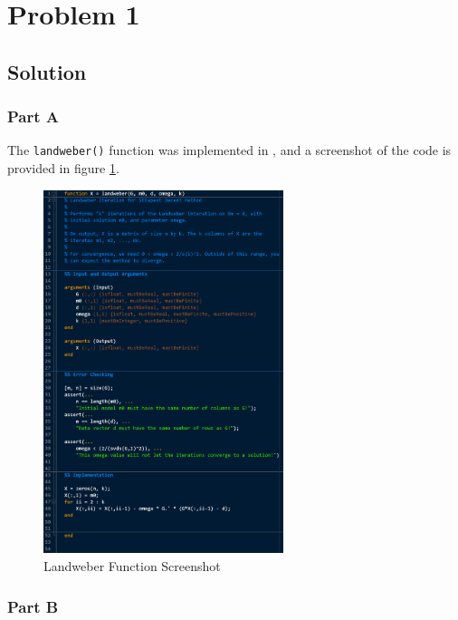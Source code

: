 
\begingroup
\allowdisplaybreaks

\newpage
\section{Problem 1}

\subsection{Solution}

\subsubsection{Part A}

The \verb|landweber()| function was implemented in \MATLAB, and a screenshot of the code is provided in figure \ref{fig: prob1 landweber}.

\begin{figure}[h] 
	\centering
	\includegraphics[width=0.625\textwidth]{./images/landweber.png}
	\caption{\MATLAB Landweber Function Screenshot}
	\label{fig: prob1 landweber}
\end{figure}
\FloatBarrier

\subsubsection{Part B}


